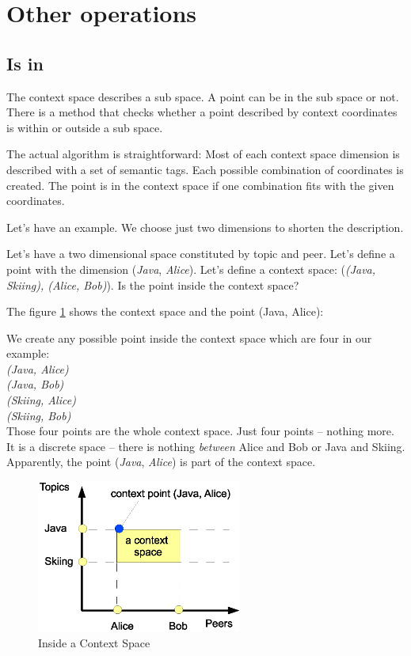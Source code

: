 \section{Other operations}

\subsection{Is in}
The context space describes a sub space. A point can be in the sub space or not.
There is a method that checks whether a point described by context coordinates is within or outside a sub space.

The actual algorithm is straightforward: Most of each context space dimension is described with a set of semantic tags. Each possible combination of coordinates is created. The point is in the context space if one combination fits with the given coordinates.

Let's have an example. We choose just two dimensions to shorten the description. 

Let's have a two dimensional space constituted by topic and peer. Let's define a point with the dimension ({\it Java}, {\it Alice}). Let's define a context space:
({\it (Java, Skiing), (Alice, Bob)}). Is the point inside the context space?

The figure \ref{fig:csIsIn} shows the context space and the point (Java, Alice):

We create any possible point inside the context space which are four in our example:\\
{\it (Java, Alice)}\\
{\it (Java, Bob)}\\
{\it (Skiing, Alice)}\\
{\it (Skiing, Bob)}\\

Those four points are the whole context space. Just four points -- nothing more. It is a discrete space -- there is nothing {\it between} Alice and Bob or Java and Skiing. Apparently, the point ({\it Java}, {\it Alice}) is part of the context space.

\begin{figure}[t]
\centering
\includegraphics[width=0.60\textwidth]{insideAContextSpace.eps}
\caption{Inside a Context Space}
\label{fig:csIsIn}
\end{figure}

